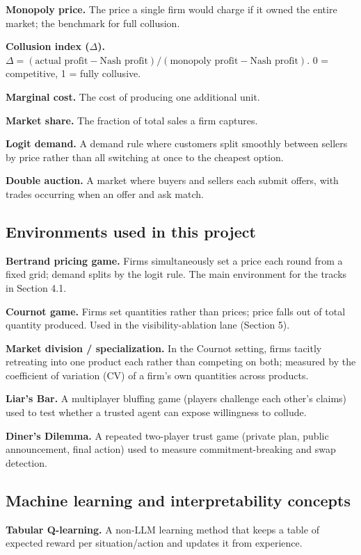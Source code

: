 \documentclass[11pt]{article}
\begin{document}
\textbf{Monopoly price.} The price a single firm would charge if it owned the entire market; the benchmark for full collusion.

\textbf{Collusion index ($\Delta$).} $\Delta = (\text{actual profit} - \text{Nash profit})/(\text{monopoly profit} - \text{Nash profit})$. 0 = competitive, 1 = fully collusive.

\textbf{Marginal cost.} The cost of producing one additional unit.

\textbf{Market share.} The fraction of total sales a firm captures.

\textbf{Logit demand.} A demand rule where customers split smoothly between sellers by price rather than all switching at once to the cheapest option.

\textbf{Double auction.} A market where buyers and sellers each submit offers, with trades occurring when an offer and ask match.

\subsection*{Environments used in this project}
\textbf{Bertrand pricing game.} Firms simultaneously set a price each round from a fixed grid; demand splits by the logit rule. The main environment for the tracks in Section 4.1.

\textbf{Cournot game.} Firms set quantities rather than prices; price falls out of total quantity produced. Used in the visibility-ablation lane (Section 5).

\textbf{Market division / specialization.} In the Cournot setting, firms tacitly retreating into one product each rather than competing on both; measured by the coefficient of variation (CV) of a firm's own quantities across products.

\textbf{Liar's Bar.} A multiplayer bluffing game (players challenge each other's claims) used to test whether a trusted agent can expose willingness to collude.

\textbf{Diner's Dilemma.} A repeated two-player trust game (private plan, public announcement, final action) used to measure commitment-breaking and swap detection.

\subsection*{Machine learning and interpretability concepts}
\textbf{Tabular Q-learning.} A non-LLM learning method that keeps a table of expected reward per situation/action and updates it from experience.
\end{document}
